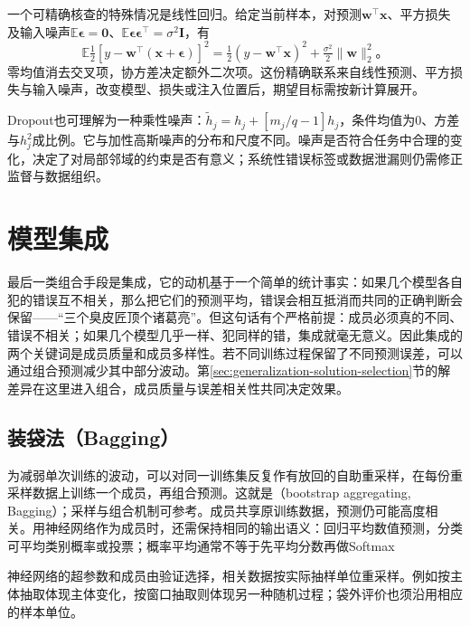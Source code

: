 一个可精确核查的特殊情况是线性回归。给定当前样本，对预测$\bm w^{\top}\bm x$、平方损失及输入噪声$\mathbb E\bm\epsilon=\bm0$、$\mathbb E\bm\epsilon\bm\epsilon^{\top}=\sigma^2\bm I$，有
\begin{equation}
  \mathbb E\tfrac12[y-\bm w^{\top}(\bm x+\bm\epsilon)]^2
  =\tfrac12(y-\bm w^{\top}\bm x)^2+\tfrac{\sigma^2}{2}\lVert\bm w\rVert_2^2\text{。}
  \label{eq:generalization-linear-noise}
\end{equation}
零均值消去交叉项，协方差决定额外二次项。这份精确联系来自线性预测、平方损失与输入噪声，改变模型、损失或注入位置后，期望目标需按新计算展开。

Dropout也可理解为一种乘性噪声：$\tilde h_j=h_j+[m_j/q-1]h_j$，条件均值为0、方差与$h_j^2$成比例。它与加性高斯噪声的分布和尺度不同。噪声是否符合任务中合理的变化，决定了对局部邻域的约束是否有意义；系统性错误标签或数据泄漏则仍需修正监督与数据组织。

\section{模型集成}
\label{sec:generalization-ensembles}

最后一类组合手段是集成，它的动机基于一个简单的统计事实：如果几个模型各自犯的错误互不相关，那么把它们的预测平均，错误会相互抵消而共同的正确判断会保留——“三个臭皮匠顶个诸葛亮”。但这句话有个严格前提：成员必须真的不同、错误不相关；如果几个模型几乎一样、犯同样的错，集成就毫无意义。因此集成的两个关键词是成员质量和成员多样性。若不同训练过程保留了不同预测误差，可以通过组合预测减少其中部分波动。第\ref{sec:generalization-solution-selection}节的解差异在这里进入组合，成员质量与误差相关性共同决定效果。

\subsection{装袋法（Bagging）}
\label{sec:generalization-bagging}

为减弱单次训练的波动，可以对同一训练集反复作有放回的自助重采样，在每份重采样数据上训练一个成员，再组合预测。这就是（bootstrap aggregating, Bagging）；采样与组合机制可参考。成员共享原训练数据，预测仍可能高度相关。用神经网络作为成员时，还需保持相同的输出语义：回归平均数值预测，分类可平均类别概率或投票；概率平均通常不等于先平均分数再做Softmax

神经网络的超参数和成员由验证选择，相关数据按实际抽样单位重采样。例如按主体抽取体现主体变化，按窗口抽取则体现另一种随机过程；袋外评价也须沿用相应的样本单位。

